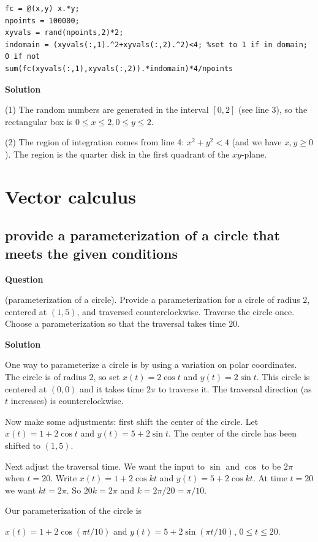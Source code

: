 \documentclass[12pt,letterpaper,noanswers]{exam}
\begin{document}
\begin{lstlisting}
fc = @(x,y) x.*y;
npoints = 100000;
xyvals = rand(npoints,2)*2;
indomain = (xyvals(:,1).^2+xyvals(:,2).^2)<4; %set to 1 if in domain; 0 if not
sum(fc(xyvals(:,1),xyvals(:,2)).*indomain)*4/npoints
\end{lstlisting}

\noindent\textbf{Solution}

(1) The random numbers are generated in the interval $[0,2]$ (see line 3), so the rectangular box is $0\leq x \leq 2, 0\leq y \leq 2$.

(2) The region of integration comes from line 4: $x^2+y^2 < 4$ (and we have $x,y\geq 0$).  The region is the quarter disk in the first quadrant of the $xy$-plane.

\section{Vector calculus}

\subsection{provide a parameterization of a circle that meets the given conditions}
\noindent\textbf{Question}

(parameterization of a circle). Provide a parameterization for a circle of radius $2$, centered at $(1,5)$, and traversed counterclockwise.  Traverse the circle once.  Choose a parameterization so that the traversal takes time $20$.

\noindent\textbf{Solution}

One way to parameterize a circle is by using a variation on polar coordinates.  The circle is of radius $2$, so set $x(t) = 2\cos t$ and $y(t) = 2\sin t$.  This circle is centered at $(0,0)$ and it takes time $2\pi$ to traverse it.  The traversal direction (as $t$ increases) is counterclockwise.

Now make some adjustments: first shift the center of the circle.  Let $x(t) = 1+2\cos t$ and $y(t) = 5 + 2\sin t$.  The center of the circle has been shifted to $(1,5)$.

Next adjust the traversal time.  We want the input to $\sin$ and $\cos$ to be $2\pi$ when $t = 20$.  Write $x(t) = 1+2\cos kt$ and $y(t) = 5+2\cos kt$.  At time $t=20$ we want $kt = 2\pi$.  So $20k = 2\pi$ and $k = 2\pi/20 = \pi/10$.

Our parameterization of the circle is

$x(t) = 1+2\cos(\pi t/10)$ and $y(t)=5+2\sin(\pi t/10)$, $0\leq t\leq 20$.
\end{document}
